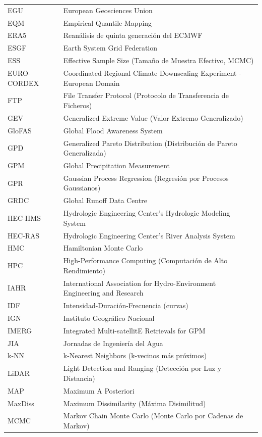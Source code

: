 \begin{longtable}{@{}>{\raggedright\arraybackslash}p{}>{\raggedright\arraybackslash}p{}@{}}
  EGU & European Geosciences Union \\
  EQM & Empirical Quantile Mapping \\
  ERA5 & Reanálisis de quinta generación del ECMWF \\
  ESGF & Earth System Grid Federation \\
  ESS & Effective Sample Size (Tamaño de Muestra Efectivo, MCMC) \\
  EURO-CORDEX & Coordinated Regional Climate Downscaling Experiment - European Domain \\
  FTP & File Transfer Protocol (Protocolo de Transferencia de Ficheros) \\
  GEV & Generalized Extreme Value (Valor Extremo Generalizado) \\
  GloFAS & Global Flood Awareness System \\
  GPD & Generalized Pareto Distribution (Distribución de Pareto Generalizada) \\
  GPM & Global Precipitation Measurement \\
  GPR & Gaussian Process Regression (Regresión por Procesos Gaussianos) \\
  GRDC & Global Runoff Data Centre \\
  HEC-HMS & Hydrologic Engineering Center's Hydrologic Modeling System \\
  HEC-RAS & Hydrologic Engineering Center's River Analysis System \\
  HMC & Hamiltonian Monte Carlo \\
  HPC & High-Performance Computing (Computación de Alto Rendimiento) \\
  IAHR & International Association for Hydro-Environment Engineering and Research \\
  IDF & Intensidad-Duración-Frecuencia (curvas) \\
  IGN & Instituto Geográfico Nacional \\
  IMERG & Integrated Multi-satellitE Retrievals for GPM \\
  JIA & Jornadas de Ingeniería del Agua \\
  k-NN & k-Nearest Neighbors (k-vecinos más próximos) \\
  LiDAR & Light Detection and Ranging (Detección por Luz y Distancia) \\
  MAP & Maximum A Posteriori \\
  MaxDiss & Maximum Dissimilarity (Máxima Disimilitud) \\
  MCMC & Markov Chain Monte Carlo (Monte Carlo por Cadenas de Markov) \\

\end{longtable}
